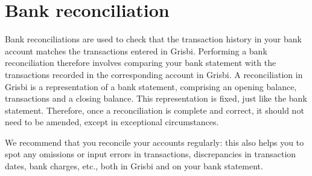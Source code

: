 %


\chapter{Bank reconciliation\label{reconciliation}}

Bank reconciliations are used to check that the transaction history in your bank account matches the transactions entered in Grisbi. Performing a bank reconciliation therefore involves comparing your bank statement with the transactions recorded in the corresponding account in Grisbi. A reconciliation in Grisbi is a representation of a bank statement, comprising an opening balance, transactions and a closing balance. This representation is fixed, just like the bank statement. Therefore, once a reconciliation is complete and correct, it should not need to be amended, except in exceptional circumstances.

We recommend that you reconcile your accounts regularly: this also helps you to spot any omissions or input errors in transactions, discrepancies in transaction dates, bank charges, etc., both in Grisbi and on your bank statement.


